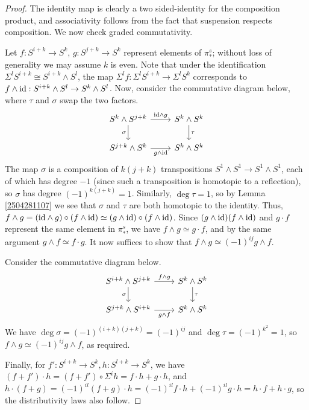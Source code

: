\documentclass[11pt, titlepage]{article} %
\def\id{\ensuremath\text{id}}
\numberwithin{equation}{subsection}
\theoremstyle{plain}
\theoremstyle{definition}
\begin{document}
\begin{proof}
The identity map is clearly a two sided-identity for the composition product, and associativity follows from the fact that suspension respects composition. We now check graded commutativity.

Let \(f : S^{i+k}\to S^k\), \(g : S^{j+k}\to S^k\) represent elements of \(\pi_*^s\); without loss of generality we may assume \(k\) is even. Note that under the identification \(\Sigma^l S^{i+k} \cong S^{i+k} \wedge S^l\), the map \(\Sigma^l f : \Sigma^l S^{i+k} \to \Sigma^l S^k\) corresponds to \(f \wedge \id : S^{i+k}\wedge S^l \to S^k \wedge S^l\). Now, consider the commutative diagram below, where \(\tau\) and \(\sigma\) swap the two factors. 
\[\begin{tikzcd}
S^k\wedge S^{j+k} \arrow[r, "\id \wedge g"] \arrow[d, swap, "\sigma"]  & S^k \wedge S^k \arrow[d, "\tau"]  \\
S^{j+k}\wedge S^k \arrow[r, swap, "g \wedge \id"]  & S^k \wedge S^k
\end{tikzcd}\]
The map \(\sigma\) is a composition of \(k(j+k)\) transpositions \(S^1 \wedge S^1 \to S^1 \wedge S^1\), each of which has degree \(-1\) (since such a transposition is homotopic to a reflection), so \(\sigma\) has degree \((-1)^{k(j+k)}=1\). Similarly, \(\deg \tau=1\), so by Lemma \ref{2504281107} we see that \(\sigma\) and \(\tau\) are both homotopic to the identity. Thus, \(f \wedge g = (\id \wedge g)\circ (f \wedge \id)\simeq (g \wedge \id)\circ (f \wedge \id)\). Since \((g \wedge \id)(f \wedge \id)\) and \(g\cdot f\) represent the same element in \(\pi_*^s\), we have \(f \wedge g \simeq g\cdot f\), and by the same argument \(g \wedge f \simeq f \cdot g\). It now suffices to show that \(f \wedge g \simeq (-1)^{ij} g \wedge f\).

Consider the commutative diagram below.
\[\begin{tikzcd}
S^{i+k}\wedge S^{j+k} \arrow[r, "f \wedge g"] \arrow[d, swap, "\sigma"]  & S^k \wedge S^k \arrow[d, "\tau"]  \\
S^{j+k}\wedge S^{i+k} \arrow[r, swap, "g \wedge f"]  & S^k \wedge S^k
\end{tikzcd}\]
We have \(\deg \sigma=(-1)^{(i+k)(j+k)}=(-1)^{ij}\) and \(\deg \tau = (-1)^{k^2}=1\), so \(f\wedge g \simeq (-1)^{ij}g\wedge f\), as required.

Finally, for \(f' : S^{i+k}\to S^k, h : S^{l+k}\to S^k\), we have \((f+f')\cdot h= (f+f')\circ \Sigma^i h = f\cdot h + g \cdot h\), and \(h\cdot (f+g)=(-1)^{il}(f+g)\cdot h=(-1)^{il}f\cdot h + (-1)^{il}g \cdot h = h\cdot f +h \cdot g\), so the distributivity laws also follow. 
\end{proof}
\end{document}
